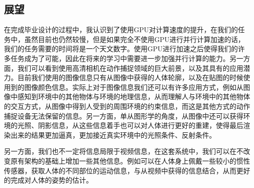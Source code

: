\subsection{展望}
在完成毕业设计的过程中，我认识到了使用GPU对计算速度的提升，在我们的任务中，虽然目前也仍然较慢，但是如果完全不使用GPU进行并行计算加速的话，我们的任务需要的时间将是一个天文数字。使用GPU进行加速之后使得我们的许多任务成为了可能，因此在将来的学习中需要进一步加强并行计算的能力。另一方面，我们可以看到使用高清相机在动作捕捉领域的巨大前景，以及其具有的应用潜力。目前我们使用的图像信息只有从图像中获得的人体轮廓，以及在贴图的时候使用到的图像颜色信息。实际上对于图像信息我们还可以有许多应用方式，例如从图像中感知到环境中的其他物体与环境的地理信息，从而理解人与环境中的其他物体的交互方式，从图像中得到人受到的周围环境的约束信息，而这是其他方式的动作捕捉设备无法保留的信息。另一方面，单从图形学的角度，从图像中还可以获得环境的光照、阴影信息，从这些信息着手也可以对人体进行更好的重建，使得最后渲染出来的结果更加逼真，更加接近真实环境中的光照条件、反射条件。

另一方面，我们也不一定将信息局限于视频信息，在这套系统中，我们可以在不改变原有架构的基础上增加一些其他信息。例如可以在人体身上佩戴一些较小的惯性传感器，获取人体的不同部位的运动信息，与从视频中获得的信息结合，从而更好的完成对人体的姿势的估计。


